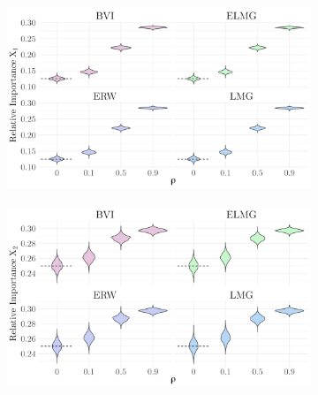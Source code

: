 \begin{figure}[H]
  \centering
  \label{fig:relimp_all}
  \begin{subfigure}[b]{0.7\linewidth}
    \centering
    \includegraphics[width=\linewidth]{Figures/ViolinPlots/Variance_V1.png}
    \label{fig:relimp_X1_fig}
  \end{subfigure}
  
  \begin{subfigure}[b]{0.7\linewidth}
    \centering
    \includegraphics[width=\linewidth]{Figures/ViolinPlots/Variance_V2.png}
    \label{fig:relimp_X2_fig}
  \end{subfigure}
  

\end{figure}
